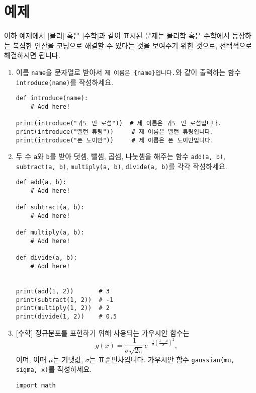 \documentclass[../main.tex]{subfiles}
\begin{document}
\section{예제}
이하 예제에서 \textsf{[물리]} 혹은 \textsf{[수학]}과 같이 표시된 문제는 물리학
혹은 수학에서 등장하는 복잡한 연산을 코딩으로 해결할 수 있다는 것을 보여주기
위한 것으로, 선택적으로 해결하시면 됩니다.
\begin{enumerate}
  \item 이름 \verb|name|을 문자열로 받아서 \verb|제 이름은 {name}입니다.|와 같이
    출력하는 함수 \verb|introduce(name)|를 작성하세요.
\begin{verbatim}
def introduce(name):
    # Add here!

print(introduce("귀도 반 로섬"))  # 제 이름은 귀도 반 로섬입니다.
print(introduce("앨런 튜링"))     # 제 이름은 앨런 튜링입니다.
print(introduce("폰 노이만"))     # 제 이름은 폰 노이만입니다.
\end{verbatim}

  \item 두 수 \verb|a|와 \verb|b|를 받아 덧셈, 뺄셈, 곱셈, 나눗셈을 해주는 함수
    \verb|add(a, b)|, \verb|subtract(a, b)|, \verb|multiply(a, b)|,
    \verb|divide(a, b)|를 각각 작성하세요.

\begin{verbatim}
def add(a, b):
    # Add here!

def subtract(a, b):
    # Add here!

def multiply(a, b):
    # Add here!

def divide(a, b):
    # Add here!


print(add(1, 2))       # 3
print(subtract(1, 2))  # -1
print(multiply(1, 2))  # 2
print(divide(1, 2))    # 0.5
\end{verbatim}

  \item \textsf{[수학]} 정규분포를 표현하기 위해 사용되는 가우시안 함수는
    \[
    g(x) = \frac{1}{\sigma \sqrt{2\pi}} e^{-\frac12 \left(\frac{x - \mu}{\sigma}\right)^2},
    \]
    이며, 이때 $\mu$는 기댓값, $\sigma$는 표준편차입니다.
    가우시안 함수 \verb|gaussian(mu, sigma, x)|를 작성하세요.
\begin{verbatim}
import math


\end{verbatim}
\end{enumerate}
\end{document}
